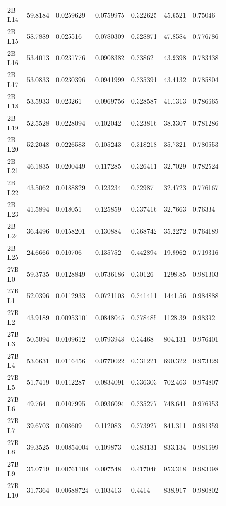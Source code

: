 \begin{longtable}{@{}L{0.13\linewidth}L{0.11\linewidth}L{0.13\linewidth}L{0.13\linewidth}L{0.13\linewidth}L{0.13\linewidth}L{0.13\linewidth}@{}}
2B L14 & 59.8184 & 0.0259629 & 0.0759975 & 0.322625 & 45.6521 & 0.75046 \\
2B L15 & 58.7889 & 0.025516 & 0.0780309 & 0.328871 & 47.8584 & 0.776786 \\
2B L16 & 53.4013 & 0.0231776 & 0.0908382 & 0.33862 & 43.9398 & 0.783438 \\
2B L17 & 53.0833 & 0.0230396 & 0.0941999 & 0.335391 & 43.4132 & 0.785804 \\
2B L18 & 53.5933 & 0.023261 & 0.0969756 & 0.328587 & 41.1313 & 0.786665 \\
2B L19 & 52.5528 & 0.0228094 & 0.102042 & 0.323816 & 38.3307 & 0.781286 \\
2B L20 & 52.2048 & 0.0226583 & 0.105243 & 0.318218 & 35.7321 & 0.780553 \\
2B L21 & 46.1835 & 0.0200449 & 0.117285 & 0.326411 & 32.7029 & 0.782524 \\
2B L22 & 43.5062 & 0.0188829 & 0.123234 & 0.32987 & 32.4723 & 0.776167 \\
2B L23 & 41.5894 & 0.018051 & 0.125859 & 0.337416 & 32.7663 & 0.76334 \\
2B L24 & 36.4496 & 0.0158201 & 0.130884 & 0.368742 & 35.2272 & 0.764189 \\
2B L25 & 24.6666 & 0.010706 & 0.135752 & 0.442894 & 19.9962 & 0.719316 \\
27B L0 & 59.3735 & 0.0128849 & 0.0736186 & 0.30126 & 1298.85 & 0.981303 \\
27B L1 & 52.0396 & 0.0112933 & 0.0721103 & 0.341411 & 1441.56 & 0.984888 \\
27B L2 & 43.9189 & 0.00953101 & 0.0848045 & 0.378485 & 1128.39 & 0.98392 \\
27B L3 & 50.5094 & 0.0109612 & 0.0793948 & 0.34468 & 804.131 & 0.976401 \\
27B L4 & 53.6631 & 0.0116456 & 0.0770022 & 0.331221 & 690.322 & 0.973329 \\
27B L5 & 51.7419 & 0.0112287 & 0.0834091 & 0.336303 & 702.463 & 0.974807 \\
27B L6 & 49.764 & 0.0107995 & 0.0936094 & 0.335277 & 748.641 & 0.976953 \\
27B L7 & 39.6703 & 0.008609 & 0.112083 & 0.373927 & 841.311 & 0.981359 \\
27B L8 & 39.3525 & 0.00854004 & 0.109873 & 0.383131 & 833.134 & 0.981699 \\
27B L9 & 35.0719 & 0.00761108 & 0.097548 & 0.417046 & 953.318 & 0.983098 \\
27B L10 & 31.7364 & 0.00688724 & 0.103413 & 0.4414 & 838.917 & 0.980802 \\

\end{longtable}
